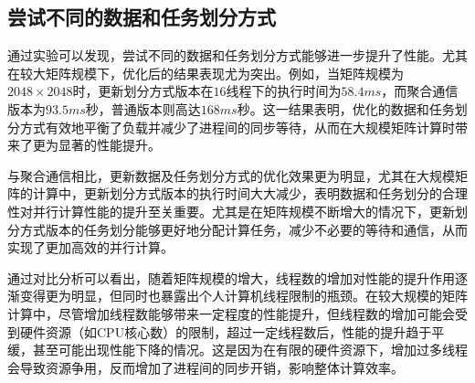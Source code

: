 \documentclass[a4paper, utf8]{ctexart}
\begin{document}
	\subsection{尝试不同的数据和任务划分方式}
	
	通过实验可以发现，尝试不同的数据和任务划分方式能够进一步提升了性能。尤其在较大矩阵规模下，优化后的结果表现尤为突出。例如，当矩阵规模为$2048\times2048$时，更新划分方式版本在$16$线程下的执行时间为$58.4ms$，而聚合通信版本为$93.5ms$秒，普通版本则高达$168ms$秒。这一结果表明，优化的数据和任务划分方式有效地平衡了负载并减少了进程间的同步等待，从而在大规模矩阵计算时带来了更为显著的性能提升。
	
	与聚合通信相比，更新数据及任务划分方式的优化效果更为明显，尤其在大规模矩阵的计算中，更新划分方式版本的执行时间大大减少，表明数据和任务划分的合理性对并行计算性能的提升至关重要。尤其是在矩阵规模不断增大的情况下，更新划分方式版本的任务划分能够更好地分配计算任务，减少不必要的等待和通信，从而实现了更加高效的并行计算。
	
	通过对比分析可以看出，随着矩阵规模的增大，线程数的增加对性能的提升作用逐渐变得更为明显，但同时也暴露出个人计算机线程限制的瓶颈。在较大规模的矩阵计算中，尽管增加线程数能够带来一定程度的性能提升，但线程数的增加可能会受到硬件资源（如CPU核心数）的限制，超过一定线程数后，性能的提升趋于平缓，甚至可能出现性能下降的情况。这是因为在有限的硬件资源下，增加过多线程会导致资源争用，反而增加了进程间的同步开销，影响整体计算效率。
	
\end{document}
